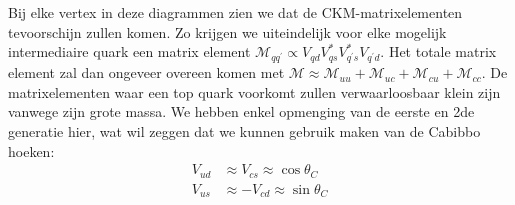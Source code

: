 \documentclass[../main.tex]{subfiles}
\begin{document}
\begin{minipage}[c]{0.5\textwidth}
    \begin{center}
    \end{center}
\end{minipage}
Bij elke vertex in deze diagrammen zien we dat de CKM-matrixelementen tevoorschijn zullen komen. Zo krijgen we uiteindelijk voor elke mogelijk intermediaire quark een matrix element $\mathcal{M}_{q q^{\prime}} \propto V_{q d} V_{q s}^{*} V_{q^{\prime} s}^{*} V_{q^{\prime} d}$. Het totale matrix element zal dan ongeveer overeen komen met $\mathcal{M} \approx \mathcal{M}_{u u}+\mathcal{M}_{u c}+\mathcal{M}_{c u}+\mathcal{M}_{c c}$. De matrixelementen waar een top quark voorkomt zullen verwaarloosbaar klein zijn vanwege zijn grote massa. We hebben enkel opmenging van de eerste en 2de generatie hier, wat wil zeggen dat we kunnen gebruik maken van de Cabibbo hoeken:
\begin{equation}
    \begin{aligned}
        \label{eq:cab_hoeken}
        V_{u d} &\approx V_{c s} \approx \cos \theta_{C} \\
        V_{u s} &\approx-V_{c d} \approx \sin \theta_{C}
    \end{aligned}
\end{equation}
\end{document}

